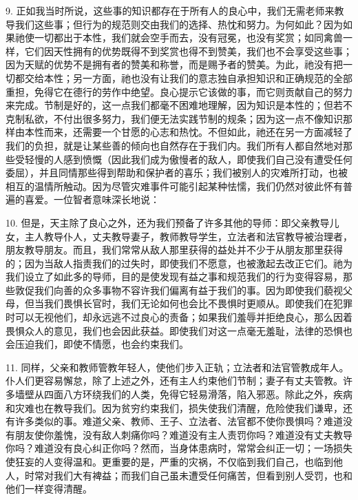 9. 正如我当时所说，这些事的知识都存在于所有人的良心中，我们无需老师来教导我们这些事；但行为的规范则交由我们的选择、热忱和努力。为何如此？因为如果祂使一切都出于本性，我们就会空手而去，没有冠冕，也没有奖赏；如同禽兽一样，它们因天性拥有的优势既得不到奖赏也得不到赞美，我们也不会享受这些事；因为天赋的优势不是拥有者的赞美和称誉，而是赐予者的赞美。为此，祂没有把一切都交给本性；另一方面，祂也没有让我们的意志独自承担知识和正确规范的全部重担，免得它在德行的劳作中绝望。良心提示它该做的事，而它则贡献自己的努力来完成。节制是好的，这一点我们都毫不困难地理解，因为知识是本性的；但若不克制私欲，不付出很多努力，我们便无法实践节制的规条；因为这一点不像知识那样由本性而来，还需要一个甘愿的心志和热忱。不但如此，祂还在另一方面减轻了我们的负担，就是让某些善的倾向也自然存在于我们内。我们所有人都自然地对那些受轻慢的人感到愤慨（因此我们成为傲慢者的敌人，即使我们自己没有遭受任何委屈），并且同情那些得到帮助和保护者的喜乐；我们被别人的灾难所打动，也被相互的温情所触动。因为尽管灾难事件可能引起某种怯懦，我们仍然对彼此怀有普遍的喜爱。一位智者意味深长地说：\par

10. 但是，天主除了良心之外，还为我们预备了许多其他的导师：即父亲教导儿女，主人教导仆人，丈夫教导妻子，教师教导学生，立法者和法官教导被治理者，朋友教导朋友。而且，我们常常从敌人那里获得的益处并不少于从朋友那里获得的；因为当敌人指责我们的过失时，即使我们不愿意，也被激起去改正它们。祂为我们设立了如此多的导师，目的是使发现有益之事和规范我们的行为变得容易，那些敦促我们向善的众多事物不容许我们偏离有益于我们的事。因为即使我们藐视父母，但当我们畏惧长官时，我们无论如何也会比不畏惧时更顺从。即使我们在犯罪时可以无视他们，却永远逃不过良心的责备；如果我们羞辱并拒绝良心，那么因着畏惧众人的意见，我们也会因此获益。即使我们对这一点毫无羞耻，法律的恐惧也会压迫我们，即使不情愿，也会约束我们。\par

11. 同样，父亲和教师管教年轻人，使他们步入正轨；立法者和法官管教成年人。仆人们更容易懈怠，除了上述之外，还有主人约束他们节制；妻子有丈夫管教。许多墙壁从四面八方环绕我们的人类，免得它轻易滑落，陷入邪恶。除此之外，疾病和灾难也在教导我们。因为贫穷约束我们，损失使我们清醒，危险使我们谦卑，还有许多类似的事。难道父亲、教师、王子、立法者、法官都不使你畏惧吗？难道没有朋友使你羞愧，没有敌人刺痛你吗？难道没有主人责罚你吗？难道没有丈夫教导你吗？难道没有良心纠正你吗？然而，当身体患病时，常常会纠正一切；一场损失使狂妄的人变得温和。更重要的是，严重的灾祸，不仅临到我们自己，也临到他人，时常对我们大有裨益；而我们自己虽未遭受任何痛苦，但看到别人受罚，也和他们一样变得清醒。\par

